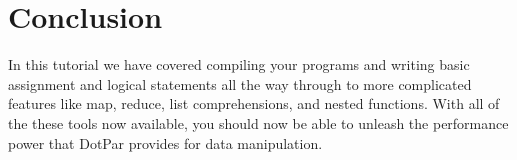 \documentclass{article}
\begin{document}
\section{Conclusion}
In this tutorial we have covered compiling your programs and writing basic assignment and logical statements all the way through to more complicated features like map, reduce, list comprehensions, and nested functions. With all of the these tools now available, you should now be able to unleash the performance power that DotPar provides for data manipulation.
\end{document}
